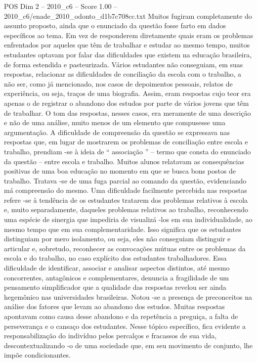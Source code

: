 \begin{textsample}{POS Dim 2 – 2010\_c6 – Score 1.00 – 2010\_c6/enade\_2010\_odonto\_d1b7c708cc.txt}
Muitos fugiram completamente do assunto proposto, ainda que o enunciado da questão fosse farto em dados específicos ao tema.
Em vez de responderem diretamente quais eram os problemas enfrentados por aqueles que têm de trabalhar e estudar ao mesmo tempo, muitos estudantes optavam por falar das dificuldades que existem na educação brasileira, de forma estendida e pasteurizada.
Vários estudantes não conseguiam, em suas respostas, relacionar as dificuldades de conciliação da escola com o trabalho, a não ser, como já mencionado, nos casos de depoimentos pessoais, relatos de experiência, ou seja, traços de uma biografia.
Assim, eram respostas cujo teor era apenas o de registrar o abandono dos estudos por parte de vários jovens que têm de trabalhar.
O tom das respostas, nesses casos, era meramente de uma descrição e não de uma análise, muito menos de um elemento que compusesse uma argumentação.
A dificuldade de compreensão da questão se expressava nas respostas que, em lugar de mostrarem os problemas de conciliação entre escola e trabalho, prendiam -se à ideia de “ associação ” – termo que consta do enunciado da questão – entre escola e trabalho.
Muitos alunos relatavam as consequências positivas de uma boa educação no momento em que se busca bons postos de trabalho.
Tratava -se de uma fuga parcial ao comando da questão, evidenciando má compreensão do mesmo.
Uma dificuldade facilmente percebida nas respostas refere -se à tendência de os estudantes tratarem dos problemas relativos à escola e, muito separadamente, daqueles problemas relativos ao trabalho, reconhecendo uma espécie de sinergia que impediria de visualizá -los em sua individualidade, ao mesmo tempo que em sua complementaridade.
Isso significa que os estudantes distinguiam por mero isolamento, ou seja, eles não conseguiam distinguir e articular e, sobretudo, reconhecer as convocações mútuas entre os problemas da escola e do trabalho, no caso explícito dos estudantes trabalhadores.
Essa dificuldade de identificar, associar e analisar aspectos distintos, até mesmo concorrentes, antagônicos e complementares, denuncia a fragilidade de um pensamento simplificador que a qualidade das respostas revelou ser ainda hegemônico nas universidades brasileiras.
Notou -se a presença de preconceitos na análise dos fatores que levam ao abandono dos estudos.
Muitas respostas apontavam como causa desse abandono e da repetência a preguiça, a falta de perseverança e o cansaço dos estudantes.
Nesse tópico específico, fica evidente a responsabilização do indivíduo pelos percalços e fracassos de sua vida, descontextualizando -o de uma sociedade que, em seu movimento de conjunto, lhe impõe condicionantes.

\end{textsample}
